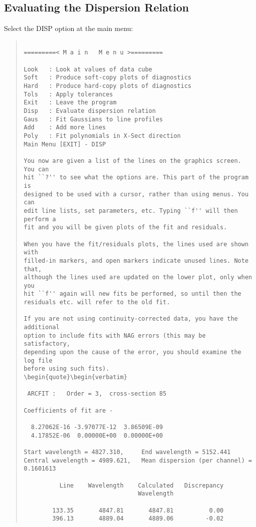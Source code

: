 \subsection{Evaluating the Dispersion Relation}

Select the DISP option at the main menu:
\begin{quote}\begin{verbatim}
 
=========< M a i n   M e n u >=========
 
Look   : Look at values of data cube
Soft   : Produce soft-copy plots of diagnostics
Hard   : Produce hard-copy plots of diagnostics
Tols   : Apply tolerances
Exit   : Leave the program
Disp   : Evaluate dispersion relation
Gaus   : Fit Gaussians to line profiles
Add    : Add more lines
Poly   : Fit polynomials in X-Sect direction
Main Menu [EXIT] - DISP

You now are given a list of the lines on the graphics screen. You can
hit ``?'' to see what the options are. This part of the program is
designed to be used with a cursor, rather than using menus. You can
edit line lists, set parameters, etc. Typing ``f'' will then perform a
fit and you will be given plots of the fit and residuals.

When you have the fit/residuals plots, the lines used are shown with
filled-in markers, and open markers indicate unused lines. Note that,
although the lines used are updated on the lower plot, only when you
hit ``f'' again will new fits be performed, so until then the
residuals etc. will refer to the old fit.

If you are not using continuity-corrected data, you have the additional
option to include fits with NAG errors (this may be satisfactory,
depending upon the cause of the error, you should examine the log file
before using such fits).
\begin{quote}\begin{verbatim}
 
 ARCFIT :   Order = 3,  cross-section 85
 
Coefficients of fit are -

  8.27062E-16 -3.97077E-12  3.86509E-09
  4.17852E-06  0.00000E+00  0.00000E+00

Start wavelength = 4827.310,     End wavelength = 5152.441
Central wavelength = 4989.621,   Mean dispersion (per channel) = 0.1601613

          Line    Wavelength    Calculated   Discrepancy
                                Wavelength

        133.35       4847.81       4847.81          0.00
        396.13       4889.04       4889.06         -0.02
\end{verbatim}\end{quote}
